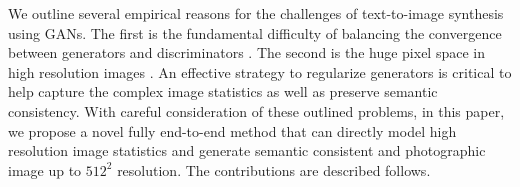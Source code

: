\documentclass[10pt,twocolumn,letterpaper]{article}
\begin{document}
We outline several empirical reasons for the challenges of text-to-image synthesis using GANs. The first is the fundamental difficulty of balancing the convergence between generators and discriminators \cite{goodfellow2014generative,improvedGAN}. %
The second is the huge pixel space in high resolution images \cite{han2017stackgan}. 
An effective strategy to regularize generators is critical to help capture the complex image statistics \cite{huang2016stacked} as well as preserve semantic consistency. 
With careful consideration of these outlined problems, in this paper, we propose a novel fully end-to-end method that can directly model high resolution image statistics and generate semantic consistent and photographic image up to $512^2$ resolution. The contributions are described follows.
\end{document}
